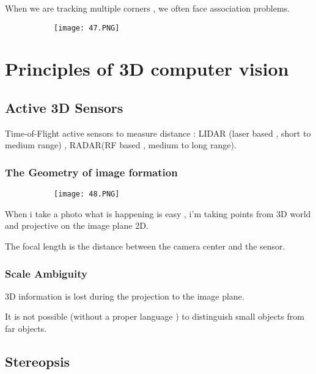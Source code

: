 \documentclass{article}
\begin{document}
When we are tracking multiple corners , we often face association problems.

\begin{figure}[ht!]
  \centering
  \begin{subfigure}[b]{0.5\linewidth}
    \texttt{[image: 47.PNG]}
  \end{subfigure}
\end{figure}

\section{Principles of 3D computer vision}

\subsection{Active 3D Sensors}

Time-of-Flight active sensors to measure distance : LIDAR (laser based , short to medium range) , RADAR(RF based , medium to long range).

\subsubsection{The Geometry of image formation}

\begin{figure}[ht!]
  \centering
  \begin{subfigure}[b]{0.6\linewidth}
    \texttt{[image: 48.PNG]}
  \end{subfigure}
\end{figure}

When i take a photo what is happening is easy , i'm taking points from 3D world and projective on the image plane 2D.

The focal length is the distance between the camera center and the sensor.

\subsubsection{Scale Ambiguity}

3D information is lost during the projection to the image plane. 

It is not possible (without a proper language ) to distinguish small objects from far objects.

\vspace{50mm}

\subsection{Stereopsis}
\end{document}
